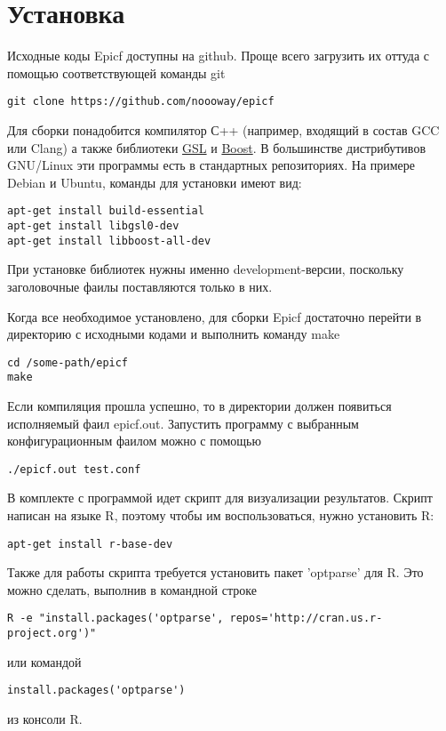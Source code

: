 \section{ Установка }
Исходные коды Epicf доступны на github. 
Проще всего загрузить их оттуда с помощью соответствующей команды git
\begin{verbatim}
git clone https://github.com/noooway/epicf
\end{verbatim}

Для сборки понадобится компилятор С++ (например, входящий в состав GCC или Clang)
а также библиотеки \href{http://www.gnu.org/software/gsl/}{GSL} и 
\href{http://www.boost.org/}{Boost}.
В большинстве дистрибутивов GNU/Linux эти программы есть в стандартных репозиториях.
На примере Debian и Ubuntu, команды для установки имеют вид:
\begin{verbatim}
apt-get install build-essential 
apt-get install libgsl0-dev
apt-get install libboost-all-dev
\end{verbatim}
При установке библиотек нужны именно development-версии,
поскольку заголовочные фаилы поставляются только в них.

Когда все необходимое установлено, для сборки Epicf достаточно 
перейти в директорию с исходными кодами и выполнить команду make
\begin{verbatim}
cd /some-path/epicf
make
\end{verbatim}

Если компиляция прошла успешно, то в директории должен появиться исполняемый фаил epicf.out.
Запустить программу с выбранным конфигурационным фаилом можно с помощью 
\begin{verbatim}
./epicf.out test.conf
\end{verbatim}

В комплекте с программой идет скрипт для визуализации результатов.
Скрипт написан на языке R, поэтому чтобы им воспользоваться, нужно установить R:
\begin{verbatim}
apt-get install r-base-dev
\end{verbatim}
Также для работы скрипта требуется установить пакет 'optparse' для R.
Это можно сделать, выполнив в командной строке
\begin{verbatim}
R -e "install.packages('optparse', repos='http://cran.us.r-project.org')"
\end{verbatim}
или командой
\begin{verbatim}
install.packages('optparse')
\end{verbatim}
из консоли R.



